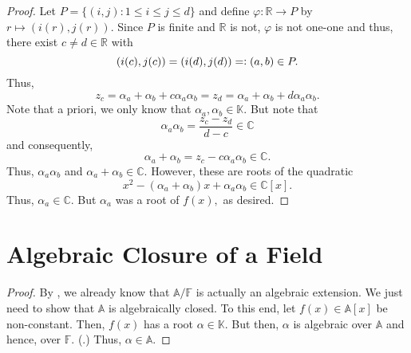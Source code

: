 \begin{proof}
    Let $P = \{(i, j) : 1 \le i \le j \le d\}$ and define $\varphi : \mathbb{R} \to P$ by $r \mapsto (i(r), j(r)).$ Since $P$ is finite and $\mathbb{R}$ is not, $\varphi$ is not one-one and thus, there exist $c \neq d \in \mathbb{R}$ with
    \begin{equation*} 
        (i(c), j(c)) = (i(d), j(d)) =\vcentcolon (a, b) \in P.
    \end{equation*}
    Thus,
    \begin{equation*} 
        z_c = \alpha_a + \alpha_b + c\alpha_a\alpha_b = z_d = \alpha_a + \alpha_b + d\alpha_a\alpha_b.
    \end{equation*}
    Note that a priori, we only know that $\alpha_a, \alpha_b \in \mathbb{K}.$ But note that
    \begin{equation*} 
        \alpha_a\alpha_b = \frac{z_c - z_d}{d - c} \in \mathbb{C}
    \end{equation*}
    and consequently,
    \begin{equation*} 
        \alpha_a + \alpha_b = z_c - c\alpha_a\alpha_b \in \mathbb{C}.
    \end{equation*}
    Thus, $\alpha_a\alpha_b$ and $\alpha_a + \alpha_b \in \mathbb{C}.$ However, these are roots of the quadratic
    \begin{equation*} 
        x^2 - (\alpha_a + \alpha_b)x + \alpha_a\alpha_b \in \mathbb{C}[x].
    \end{equation*}
    Thus, $\alpha_a \in \mathbb{C}.$ But $\alpha_a$ was a root of $f(x),$ as desired.
\end{proof}

\section{Algebraic Closure of a Field}
\alglcosureinalgclosedisclosed*\label{prop:alglcosureinalgclosedisclosed2}
\begin{flushright}\hyperref[prop:alglcosureinalgclosedisclosed]{\upsym}\end{flushright}
\begin{proof}
    By , we already know that $\mathbb{A}/\mathbb{F}$ is actually an algebraic extension. We just need to show that $\mathbb{A}$ is algebraically closed. To this end, let $f(x) \in \mathbb{A}[x]$ be non-constant. Then, $f(x)$ has a root $\alpha \in \mathbb{K}.$ But then, $\alpha$ is algebraic over $\mathbb{A}$ and hence, over $\mathbb{F}.$ (.) Thus, $\alpha \in \mathbb{A}.$
\end{proof}

